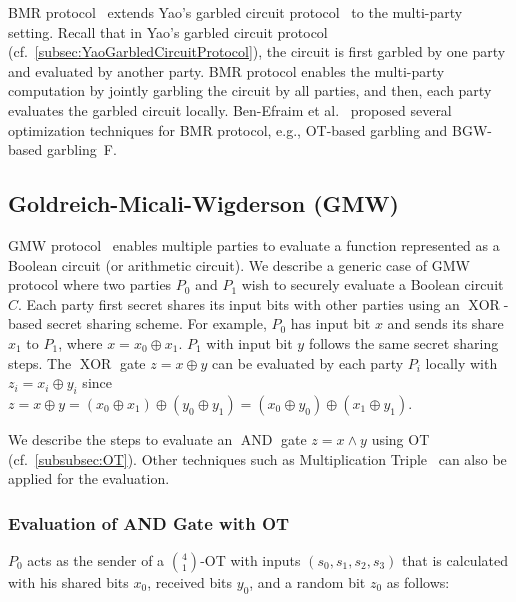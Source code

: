 BMR protocol~\cite{beaver1990round} extends Yao's garbled circuit protocol~\cite{Yao86} to the multi-party setting. Recall that in Yao's garbled circuit protocol (cf.~\autoref{subsec:YaoGarbledCircuitProtocol}), the circuit is first garbled by one party and evaluated by another party. BMR protocol enables the multi-party computation by jointly garbling the circuit by all parties, and then, each party evaluates the garbled circuit locally. Ben-Efraim et al.~\cite{ben2016optimizing} proposed several optimization techniques for BMR protocol, e.g., OT-based garbling and BGW-based garbling~\cite{wigderson1988completeness}F.


\subsection{Goldreich-Micali-Wigderson (GMW)}
\label{subsec:GMW}
GMW protocol~\cite{goldwasser1987play} enables multiple parties to evaluate a function represented as a Boolean circuit (or arithmetic circuit).
We describe a generic case of GMW protocol where two parties $P_0$ and $P_1$ wish to securely evaluate a Boolean circuit $C$.
Each party first secret shares its input bits with other parties using an $\operatorname{XOR}$-based secret sharing scheme. For example, $P_{0}$ has input bit $x$ and sends its share $x_{1} $ to $P_1$, where $x=x_0 \oplus x_1$. $P_1$ with input bit $y$ follows the same secret sharing steps.
The $\operatorname{XOR}$ gate $z=x\oplus y$ can be evaluated by each party $P_i$ locally with $z_i= x_i \oplus y_i$ since $z= x\oplus y = \left(x_0 \oplus x_1\right) \oplus \left(y_0 \oplus y_1\right) =\left(x_0 \oplus y_0\right) \oplus \left(x_1 \oplus y_1\right)$.

We describe the steps to evaluate an $\operatorname{AND}$ gate $z=x \land y$ using OT (cf.~\autoref{subsubsec:OT}).
Other techniques such as Multiplication Triple~\cite{beaver1991efficient} can also be applied for the evaluation.

\subsubsection{Evaluation of AND Gate with OT~\cite{choi2012secure, zohner2017faster}}
$P_0$ acts as the sender of a $\binom{4}{1} $-OT with inputs $\left(s_0,s_1,s_2,s_3\right) $ that is calculated with his shared bits $x_0$, received bits $y_0$, and a random bit $z_0$ as follows:

